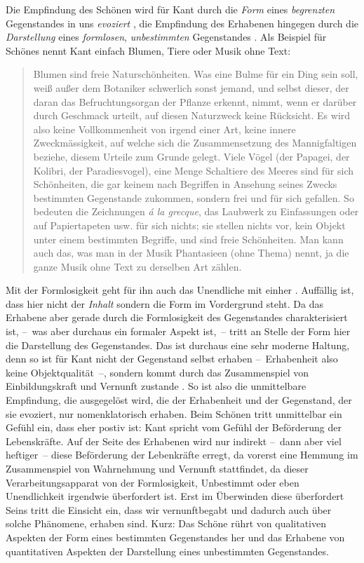 Die Empfindung des Schönen wird für Kant durch die \emph{Form} eines
\emph{begrenzten} Gegenstandes in uns \emph{evoziert} \citep[vgl. S. 47 f. u. 48
  ff.]{Kant1790}, die Empfindung des
  Erhabenen hingegen durch die \emph{Darstellung} eines \emph{formlosen},
  \emph{unbestimmten} Gegenstandes \citep[vgl. S. 105 ff.]{Kant1790}.
Als Beispiel für Schönes nennt Kant einfach Blumen, Tiere oder Musik ohne
  Text:
  \begin{quote}
    Blumen sind freie Naturschönheiten. Was eine Bulme für ein Ding sein soll,
    weiß außer dem Botaniker schwerlich sonst jemand, und selbst dieser, der
    daran das Befruchtungsorgan der Pflanze erkennt, nimmt, wenn er darüber
    durch Geschmack urteilt, auf diesen Naturzweck keine Rücksicht. Es wird
    also keine Vollkommenheit von irgend einer Art, keine innere
    Zweckmässigkeit, auf welche sich die Zusammensetzung des Mannigfaltigen
    beziehe, diesem Urteile zum Grunde gelegt. Viele Vögel (der Papagei, der
    Kolibri, der Paradiesvogel), eine Menge Schaltiere des Meeres sind für
    sich Schönheiten, die gar keinem nach Begriffen in Ansehung seines Zwecks
    bestimmten Gegenstande zukommen, sondern frei und für sich gefallen. So
    bedeuten die Zeichnungen \emph{\'a la grecque}, das Laubwerk zu
    Einfassungen oder auf Papiertapeten usw. für sich nichts;
    sie stellen nichts vor, kein Objekt unter einem bestimmten Begriffe,
    und sind freie Schönheiten. Man kann auch das, was man in der Musik
    Phantasieen (ohne Thema) nennt, ja die ganze Musik ohne Text zu derselben
    Art zählen.
  \end{quote} \citep[S. 83 f.]{Kant1790}
Mit der Formlosigkeit geht für ihn auch das Unendliche mit einher \citep[vgl. S. 105]{Kant1790}.
Auffällig ist, dass hier nicht der \emph{Inhalt} sondern die Form im
  Vordergrund steht.
Da das Erhabene aber gerade durch die Formlosigkeit des Gegenstandes charakterisiert
  ist, --~was aber durchaus ein formaler Aspekt ist,~-- tritt an Stelle der
  Form hier die Darstellung des Gegenstandes.
Das ist durchaus eine sehr moderne Haltung, denn so ist für Kant nicht der
  Gegenstand selbst erhaben --~Erhabenheit also keine Objektqualität~--,
  sondern kommt durch das Zusammenspiel von Einbildungskraft und Vernunft
  zustande \citep[vgl. S. ?]{Kant1790}.
So ist also die unmittelbare Empfindung, die ausgegelöst wird, die der
  Erhabenheit und der Gegenstand, der sie evoziert, nur nomenklatorisch \glqq
  erhaben\grqq.
Beim Schönen tritt unmittelbar ein Gefühl ein, dass eher postiv ist: Kant
  spricht vom Gefühl der \glqq Beförderung der Lebenskräfte\grqq.
Auf der Seite des Erhabenen wird nur indirekt --~dann aber viel heftiger~--
  diese Beförderung der Lebenkräfte erregt, da vorerst eine Hemmung im
  Zusammenspiel von Wahrnehmung und Vernunft stattfindet, da dieser
  Verarbeitungsapparat von der Formlosigkeit, Unbestimmt oder eben
  Unendlichkeit irgendwie überfordert ist.
Erst im Überwinden diese überfordert Seins tritt die Einsicht ein,
  dass wir vernunftbegabt und dadurch auch über solche Phänomene, erhaben
  sind.
Kurz: Das Schöne rührt von qualitativen Aspekten der Form eines bestimmten
  Gegenstandes her und das Erhabene von quantitativen Aspekten der Darstellung
  eines unbestimmten Gegenstandes.

